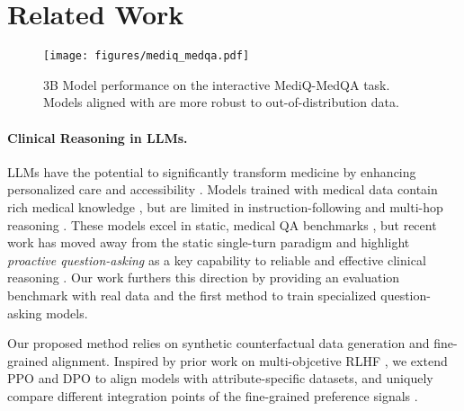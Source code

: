 \section{Related Work}
\begin{figure}[h!]
    \centering
    \texttt{[image: figures/mediq\_medqa.pdf]}\vspace{-3mm}
    \caption{3B Model performance on the interactive MediQ-MedQA task. Models aligned with \methodname are more robust to out-of-distribution data.}
    \label{fig:results:medqa}\vspace{-3mm}
\end{figure}

\paragraph{Clinical Reasoning in LLMs. }

LLMs have the potential to significantly transform medicine by enhancing personalized care and accessibility \citep{shanmugam2024generative}. 
Models trained with medical data contain rich medical knowledge \citep{singhal2025toward,lewis-etal-2020-pretrained,chen2023meditron,labrak2024biomistral,singhal2023large,brin2023comparing}, but are limited in instruction-following and multi-hop reasoning \cite{hager2024evaluation, arroyo2024openclinicalllmssensitive,nov2023putting,zhang2014understanding}.
These models excel in static, medical QA benchmarks \citep{jin2020disease,pal2022medmcqa},
but recent work has moved away from the static single-turn paradigm and highlight \emph{proactive question-asking} as a key capability to reliable and effective clinical reasoning \citep{li2024mediq, hu2024uncertainty}. Our work furthers this direction by providing an evaluation benchmark with real data and the first method to train specialized question-asking models.


Our proposed method relies on synthetic counterfactual data generation \citep{mishra2024llm, ding2024data, park-etal-2024-valuescope} and fine-grained alignment. 
Inspired by prior work on multi-objcetive RLHF \citep{zhou2023beyond,wu2023fine}, we extend PPO \citep{ouyang2022training,christiano2017deep} and DPO \citep{rafailov2023direct} to align models with attribute-specific datasets, and uniquely compare different integration points of the fine-grained preference signals \citep{rame2024rewarded,chronopoulou2023adaptersoup,wang2024interpretable}.